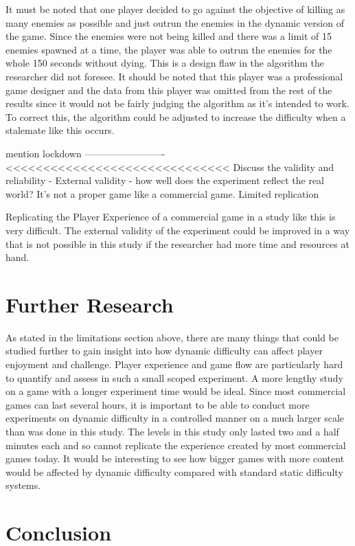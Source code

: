\documentclass[journal]{IEEEtran}
\begin{document}
It must be noted that one player decided to go against the objective of killing as many enemies as possible and just outrun the enemies in the dynamic version of the game. Since the enemies were not being killed and there was a limit of 15 enemies spawned at a time, the player was able to outrun the enemies for the whole 150 seconds without dying. This is a design flaw in the algorithm the researcher did not foresee. It should be noted that this player was a professional game designer and the data from this player was omitted from the rest of the results since it would not be fairly judging the algorithm as it's intended to work. To correct this, the algorithm could be adjusted to increase the difficulty when a stalemate like this occurs.

mention lockdown -------------------------<<<<<<<<<<<<<<<<<<<<<<<<<<<<<<
Discuss the validity and reliability - 
External validity - how well does the experiment reflect the real world?
It's not a proper game like a commercial game. Limited replication

Replicating the Player Experience of a commercial game in a study like this is very difficult. The external validity of the experiment could be improved in a way that is not possible in this study if the researcher had more time and resources at hand. 

\section{Further Research}
As stated in the limitations section above, there are many things that could be studied further to gain insight into how dynamic difficulty can affect player enjoyment and challenge. Player experience and game flow are particularly hard to quantify and assess in such a small scoped experiment. A more lengthy study on a game with a longer experiment time would be ideal. Since most commercial games can last several hours, it is important to be able to conduct more experiments on dynamic difficulty in a controlled manner on a much larger scale than was done in this study. The levels in this study only lasted two and a half minutes each and so cannot replicate the experience created by most commercial games today. It would be interesting to see how bigger games with more content would be affected by dynamic difficulty compared with standard static difficulty systems. 

\section{Conclusion}
\end{document}

